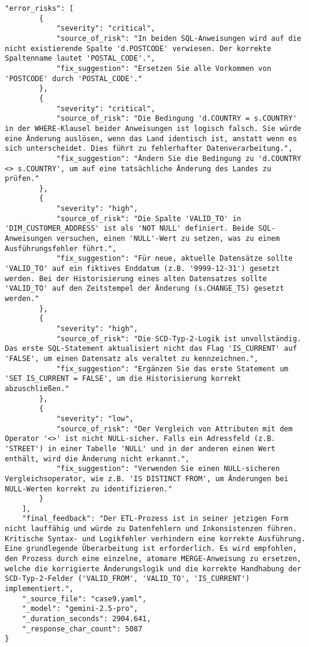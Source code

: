 \begin{lstlisting}[caption={Ausgabe: Gemini 2.5 Pro Anwendungsfall 9 Robustheitsdurchlauf},label={gemini_case9_prompt3}]
    "error_risks": [
        {
            "severity": "critical",
            "source_of_risk": "In beiden SQL-Anweisungen wird auf die nicht existierende Spalte 'd.POSTCODE' verwiesen. Der korrekte Spaltenname lautet 'POSTAL_CODE'.",
            "fix_suggestion": "Ersetzen Sie alle Vorkommen von 'POSTCODE' durch 'POSTAL_CODE'."
        },
        {
            "severity": "critical",
            "source_of_risk": "Die Bedingung 'd.COUNTRY = s.COUNTRY' in der WHERE-Klausel beider Anweisungen ist logisch falsch. Sie würde eine Änderung auslösen, wenn das Land identisch ist, anstatt wenn es sich unterscheidet. Dies führt zu fehlerhafter Datenverarbeitung.",
            "fix_suggestion": "Ändern Sie die Bedingung zu 'd.COUNTRY <> s.COUNTRY', um auf eine tatsächliche Änderung des Landes zu prüfen."
        },
        {
            "severity": "high",
            "source_of_risk": "Die Spalte 'VALID_TO' in 'DIM_CUSTOMER_ADDRESS' ist als 'NOT NULL' definiert. Beide SQL-Anweisungen versuchen, einen 'NULL'-Wert zu setzen, was zu einem Ausführungsfehler führt.",
            "fix_suggestion": "Für neue, aktuelle Datensätze sollte 'VALID_TO' auf ein fiktives Enddatum (z.B. '9999-12-31') gesetzt werden. Bei der Historisierung eines alten Datensatzes sollte 'VALID_TO' auf den Zeitstempel der Änderung (s.CHANGE_TS) gesetzt werden."
        },
        {
            "severity": "high",
            "source_of_risk": "Die SCD-Typ-2-Logik ist unvollständig. Das erste SQL-Statement aktualisiert nicht das Flag 'IS_CURRENT' auf 'FALSE', um einen Datensatz als veraltet zu kennzeichnen.",
            "fix_suggestion": "Ergänzen Sie das erste Statement um 'SET IS_CURRENT = FALSE', um die Historisierung korrekt abzuschließen."
        },
        {
            "severity": "low",
            "source_of_risk": "Der Vergleich von Attributen mit dem Operator '<>' ist nicht NULL-sicher. Falls ein Adressfeld (z.B. 'STREET') in einer Tabelle 'NULL' und in der anderen einen Wert enthält, wird die Änderung nicht erkannt.",
            "fix_suggestion": "Verwenden Sie einen NULL-sicheren Vergleichsoperator, wie z.B. 'IS DISTINCT FROM', um Änderungen bei NULL-Werten korrekt zu identifizieren."
        }
    ],
    "final_feedback": "Der ETL-Prozess ist in seiner jetzigen Form nicht lauffähig und würde zu Datenfehlern und Inkonsistenzen führen. Kritische Syntax- und Logikfehler verhindern eine korrekte Ausführung. Eine grundlegende Überarbeitung ist erforderlich. Es wird empfohlen, den Prozess durch eine einzelne, atomare MERGE-Anweisung zu ersetzen, welche die korrigierte Änderungslogik und die korrekte Handhabung der SCD-Typ-2-Felder ('VALID_FROM', 'VALID_TO', 'IS_CURRENT') implementiert.",
    "_source_file": "case9.yaml",
    "_model": "gemini-2.5-pro",
    "_duration_seconds": 2904.641,
    "_response_char_count": 5087
}
\end{lstlisting}

